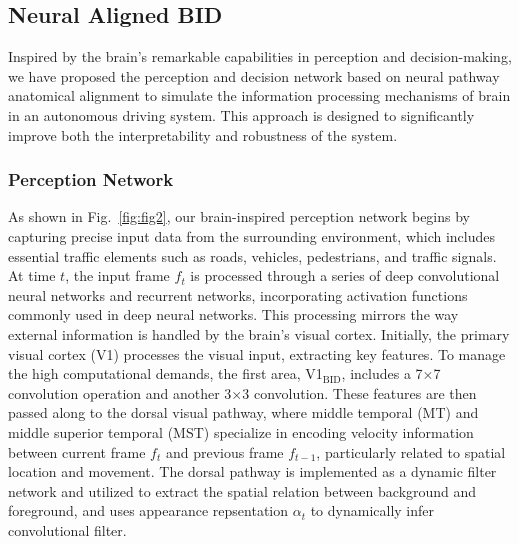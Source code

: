 \documentclass[preprint,12pt]{elsarticle}
\begin{document}
\subsection{Neural Aligned BID}
\hspace{1pc}Inspired by the brain's remarkable capabilities in perception and decision-making, we have proposed the perception and decision network based on neural pathway anatomical alignment to simulate the information processing mechanisms of brain in an autonomous driving system. 
This approach is designed to significantly improve both the interpretability and robustness of the system.

\subsubsection{Perception Network}
\hspace{1pc}As shown in Fig.~\ref{fig:fig2}, our brain-inspired perception network begins by capturing precise input data from the surrounding environment, which includes essential traffic elements such as roads, vehicles, pedestrians, and traffic signals. 
At time $t$, the input frame $f_t$ is processed through a series of deep convolutional neural networks and recurrent networks, incorporating activation functions commonly used in deep neural networks. 
This processing mirrors the way external information is handled by the brain's visual cortex\cite{kubilius2019brain}. 
Initially, the primary visual cortex (V1) processes the visual input, extracting key features. 
To manage the high computational demands, the first area, V1$_\text{BID}$, includes a 7$\times$7 convolution operation and another 3$\times$3 convolution. 
These features are then passed along to the dorsal visual pathway, where middle temporal (MT) and middle superior temporal (MST) specialize in encoding velocity information between current frame $ f_t $ and previous frame $ f_{t-1} $, particularly related to spatial location and movement\cite{wang2022btn}. 
The dorsal pathway is implemented as a dynamic filter network\cite{jia2016dynamic} and utilized to extract the spatial relation between background and foreground, 
and uses appearance repsentation $ \alpha_t $ to dynamically infer convolutional filter.
\end{document}
